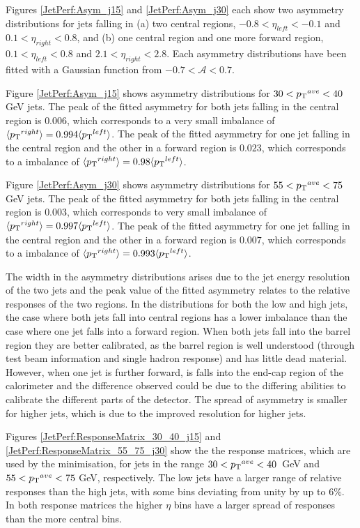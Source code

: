 Figures \ref{JetPerf:Asym_j15} and \ref{JetPerf:Asym_j30} each show two asymmetry distributions for jets falling in (a) two central regions, $-0.8<\eta_{left}<-0.1$ and $0.1<\eta_{right}<0.8$, and (b) one central region and one more forward region, $0.1<\eta_{left}<0.8$ and $2.1<\eta_{right}<2.8$. 
Each asymmetry distributions have been fitted with a Gaussian function from $-0.7<\mathcal{A}<0.7$.

Figure \ref{JetPerf:Asym_j15} shows asymmetry distributions for $30<\mbox{$\mbox{$p_{\rm T}$}{}^{ave}$}{}<40$ GeV jets.
The peak of the fitted asymmetry for both jets falling in the central region is $0.006$, which corresponds to a very small \pt{} imbalance of $\mbox{$\langle \mbox{$p_{\rm T}$}{}^{right} \rangle$}= 0.994 \mbox{$\langle \mbox{$p_{\rm T}$}{}^{left} \rangle$}$.
The peak of the fitted asymmetry for one jet falling in the central region and the other in a forward region is $0.023$, which corresponds to a \pt{} imbalance of $\mbox{$\langle \mbox{$p_{\rm T}$}{}^{right} \rangle$}= 0.98 \mbox{$\langle \mbox{$p_{\rm T}$}{}^{left} \rangle$}$.

Figure \ref{JetPerf:Asym_j30} shows asymmetry distributions for $55<\mbox{$\mbox{$p_{\rm T}$}{}^{ave}$}{}<75$ GeV jets.
The peak of the fitted asymmetry for both jets falling in the central region is $0.003$, which corresponds to very small \pt{} imbalance of $\mbox{$\langle \mbox{$p_{\rm T}$}{}^{right} \rangle$}= 0.997 \mbox{$\langle \mbox{$p_{\rm T}$}{}^{left} \rangle$}$. 
The peak of the fitted asymmetry for one jet falling in the central region and the other in a forward region is $0.007$, which corresponds to a \pt{} imbalance of $\mbox{$\langle \mbox{$p_{\rm T}$}{}^{right} \rangle$}= 0.993 \mbox{$\langle \mbox{$p_{\rm T}$}{}^{left} \rangle$}$.

The width in the asymmetry distributions arises due to the jet energy resolution of the two jets and the peak value of the fitted asymmetry relates to the relative responses of the two regions.
In the distributions for both the low and high \ptave{} jets, the case where both jets fall into central regions has a lower \pt{} imbalance than the case where one jet falls into a forward region.  
When both jets fall into the barrel region they are better calibrated, as the barrel region is well understood (through test beam information and single hadron response) and has little dead material.
However, when one jet is further forward, is falls into the end-cap region of the calorimeter and the difference observed could be due to the differing abilities to calibrate the different parts of the detector. 
The spread of asymmetry is smaller for higher \ptave{} jets, which is due to the improved resolution for higher \pt{} jets.


Figures \ref{JetPerf:ResponseMatrix_30_40_j15} and \ref{JetPerf:ResponseMatrix_55_75_j30} show the the response matrices, which are used by the minimisation, for jets in the range $30<\mbox{$\mbox{$p_{\rm T}$}{}^{ave}$}{}<40$~GeV and $55<\mbox{$\mbox{$p_{\rm T}$}{}^{ave}$}{}<75$ GeV, respectively.
The low \ptave{} jets have a larger range of relative responses than the high \ptave{} jets, with some bins deviating from unity by up to $6\%$.
In both response matrices the higher $\eta$ bins have a larger spread of responses than the more central bins.


